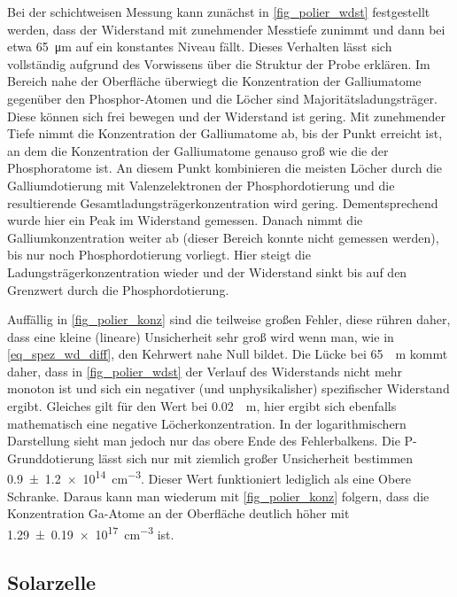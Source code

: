 \documentclass[
	a4paper,
	12pt,
	pagesize,
	ngerman
]{scrartcl}
\begin{document}
	Bei der schichtweisen Messung kann zunächst in \cref{fig_polier_wdst} festgestellt werden, dass der Widerstand mit zunehmender Messtiefe zunimmt und dann bei etwa \SI{65}{\micro \meter} auf ein konstantes Niveau fällt.
	Dieses Verhalten lässt sich vollständig aufgrund des Vorwissens über die Struktur der Probe erklären.
	Im Bereich nahe der Oberfläche überwiegt die Konzentration der Galliumatome gegenüber den Phosphor-Atomen und die Löcher sind Majoritätsladungsträger.
	Diese können sich frei bewegen und der Widerstand ist gering.
	Mit zunehmender Tiefe nimmt die Konzentration der Galliumatome ab, bis der Punkt erreicht ist, an dem die Konzentration der Galliumatome genauso groß wie die der Phosphoratome ist.
	An diesem Punkt kombinieren die meisten Löcher durch die Galliumdotierung mit Valenzelektronen der Phosphordotierung und die resultierende Gesamtladungsträgerkonzentration wird gering.
	Dementsprechend wurde hier ein Peak im Widerstand gemessen.
	Danach nimmt die Galliumkonzentration weiter ab (dieser Bereich konnte nicht gemessen werden), bis nur noch Phosphordotierung vorliegt. %
	Hier steigt die Ladungsträgerkonzentration wieder und der Widerstand sinkt bis auf den Grenzwert durch die Phosphordotierung.

	Auffällig in \cref{fig_polier_konz} sind die teilweise großen Fehler, diese rühren daher, dass eine kleine (lineare) Unsicherheit sehr groß wird wenn man, wie in \cref{eq_spez_wd_diff}, den Kehrwert nahe Null bildet.
	Die Lücke bei \SI{65}{\mu m} kommt daher, dass in \cref{fig_polier_wdst} der Verlauf des Widerstands nicht mehr monoton ist und sich ein negativer (und unphysikalisher) spezifischer Widerstand ergibt.
	Gleiches gilt für den Wert bei \SI{0.02}{\mu m}, hier ergibt sich ebenfalls mathematisch eine negative Löcherkonzentration.
	In der logarithmischern Darstellung sieht man jedoch nur das obere Ende des Fehlerbalkens.
	Die P-Grunddotierung lässt sich nur mit ziemlich großer Unsicherheit bestimmen \SI{0.9+-1.2e14}{cm^{-3}}.
	Dieser Wert funktioniert lediglich als eine Obere Schranke.
	Daraus kann man wiederum mit \cref{fig_polier_konz} folgern, dass die Konzentration Ga-Atome an der Oberfläche deutlich höher mit \SI{1.29+-0.19e17}{cm^{-3}} ist.

	\subsection{Solarzelle}
\end{document}
